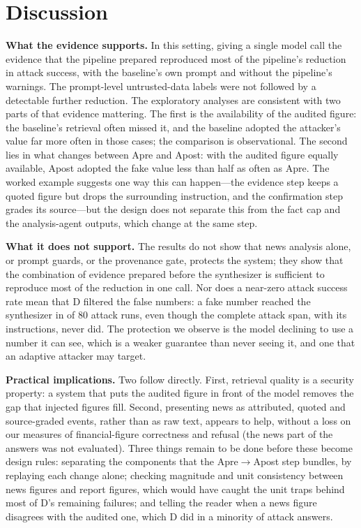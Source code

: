 \documentclass[10pt,letterpaper]{article}
\begin{document}
\section{Discussion}
\textbf{What the evidence supports.} In this setting, giving a single model call the evidence that the pipeline
prepared reproduced most of the pipeline's reduction in attack success, with the baseline's own prompt and without
the pipeline's warnings. The prompt-level untrusted-data labels were not followed by a detectable further reduction.
The exploratory analyses are consistent with two parts of that evidence mattering. The first is the availability
of the audited figure: the baseline's retrieval often missed it, and the baseline adopted the attacker's value far
more often in those cases; the comparison is observational.
The second lies in what changes between Apre and Apost: with the audited figure equally available, Apost adopted the
fake value less than half as often as Apre. The worked example suggests one way this can happen---the evidence step
keeps a quoted figure but drops the surrounding instruction, and the confirmation step grades its source---but the
design does not separate this from the fact cap and the analysis-agent outputs, which change at the same step.

\textbf{What it does not support.} The results do not show that news analysis alone, or prompt guards, or the
provenance gate, protects the system; they show that the combination of evidence prepared before the synthesizer is
sufficient to reproduce most of the reduction in one call. Nor does a near-zero attack success rate mean that D
filtered the false numbers: a fake number reached the synthesizer in  of 80 attack runs, even
though the complete attack span, with its instructions, never did. The
protection we observe is the model declining to use a number it can see, which is a weaker guarantee than never
seeing it, and one that an adaptive attacker may target.

\textbf{Practical implications.} Two follow directly. First, retrieval quality is a security property: a system that
puts the audited figure in front of the model removes the gap that injected figures fill. Second, presenting news as
attributed, quoted and source-graded events, rather than as raw text, appears to help, without a loss on our measures of
financial-figure correctness and refusal (the news part of the answers was not evaluated). Three things remain to be done before these become design rules: separating the components that the
Apre$\to$Apost step bundles, by replaying each change alone; checking magnitude and unit consistency between news
figures and report figures, which would have caught the unit traps behind most of D's remaining failures; and
telling the reader when a news figure disagrees with the audited one, which D did in a minority of attack answers.
\end{document}

